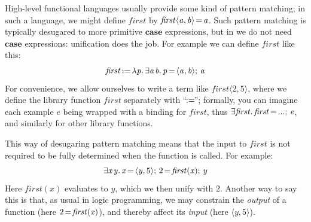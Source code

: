 \documentclass[acmsmall]{acmart}
\newcommand{\Varid}[1]{\mathit{#1}}
\begin{document}
High-level functional languages usually provide some kind of
pattern matching; in such a language, we might define \ensuremath{\Varid{first}} by
\ensuremath{\Varid{first}\langle\Varid{a},\Varid{b}\rangle\hspace{-0.14em}=\hspace{-0.14em}\Varid{a}}. Such pattern matching is typically desugared to
more primitive \ensuremath{\textbf{case}} expressions, but in \versecalc{} we do not need \ensuremath{\textbf{case}} expressions:
unification does the job.  For example we can define \ensuremath{\Varid{first}} like this:
$$
\ensuremath{\Varid{first}\hspace{-0.14em}:=\hspace{-0.14em}\lambda\Varid{p}.\,\exists\Varid{a}\hspace{0.1em}\Varid{b}.\,\Varid{p}\hspace{-0.14em}=\hspace{-0.14em}\langle{}\Varid{a},\Varid{b}\rangle;\,\Varid{a}}
$$
For convenience, we allow ourselves to write a term like
\ensuremath{\Varid{first}\langle\mathrm{2},\mathrm{5}\rangle}, where we define the library function \ensuremath{\Varid{first}} separately with ``\ensuremath{\hspace{-0.14em}:=\hspace{-0.14em}}''; formally, you can imagine
each example \ensuremath{\Varid{e}} being wrapped with a binding for \ensuremath{\Varid{first}}, thus \ensuremath{\exists\Varid{first}.\,\Varid{first}\hspace{-0.14em}=\hspace{-0.14em}\mathbin{...};\,\Varid{e}},
and similarly for other library functions.

This way of desugaring pattern matching means that the input
to \ensuremath{\Varid{first}} is not required to be fully determined when the function is called. For example:
$$
\ensuremath{\exists\Varid{x}\hspace{0.1em}\Varid{y}.\,\Varid{x}\hspace{-0.14em}=\hspace{-0.14em}\langle{}\Varid{y},\mathrm{5}\rangle;\,\mathrm{2}\hspace{-0.14em}=\hspace{-0.14em}\Varid{first}(\Varid{x});\,\Varid{y}}
$$
Here \ensuremath{\Varid{first}(\Varid{x})} evaluates to \ensuremath{\Varid{y}}, which we then unify with \ensuremath{\mathrm{2}}.
Another way to say this is that, as usual in logic programming, we may
constrain the \emph{output} of a function (here \ensuremath{\mathrm{2}\hspace{-0.14em}=\hspace{-0.14em}\Varid{first}(\Varid{x})}), and thereby
affect its \emph{input} (here \ensuremath{\langle{}\Varid{y},\mathrm{5}\rangle}).
\end{document}
